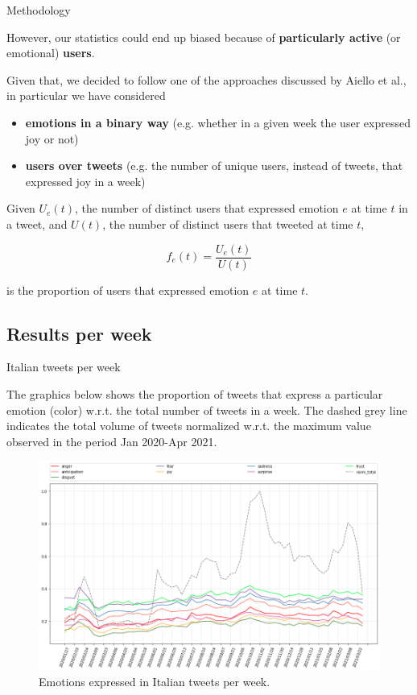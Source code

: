 \documentclass[8pt]{beamer}  %
\begin{document}
\begin{frame}{Methodology}

    However, our statistics could end up biased because of \textbf{particularly active} (or emotional) \textbf{users}.
    
    Given that, we decided to follow one of the approaches discussed by Aiello et al.\autocite{aiello2020epidemic}, in particular we have considered
	
	\begin{itemize}
	    \item \textbf{emotions in a binary way} (e.g. whether in a given week the user expressed joy or not)
	    \item \textbf{users over tweets} (e.g. the number of unique users, instead of tweets, that expressed joy in a week)
	\end{itemize}
	
	\begin{definition}
	    Given \(U_e(t)\), the number of distinct users that expressed emotion \(e\) at time \(t\) in a tweet, and \(U(t)\), the number of distinct users that tweeted at time \(t\),
	    
	    \[f_e(t) = \frac{U_e(t)}{U(t)}\]
	    
	    is the proportion of users that expressed emotion \(e\) at time \(t\).
	\end{definition}

\end{frame}

\subsection{Results per week}
\begin{frame}{Italian tweets per week}
	
	The graphics below shows the proportion of tweets that express a particular emotion (color) w.r.t. the total number of tweets in a week. The dashed grey line indicates the total volume of tweets normalized w.r.t. the maximum value observed in the period Jan 2020-Apr 2021.
	
	\begin{figure}[h]
    	\includegraphics[scale=.29]{assets/img/it_emotions.png}
    	\caption{Emotions expressed in Italian tweets per week.}
    	\label{fig:it_emotion_weekly}
    \end{figure}

\end{frame}
\end{document}
